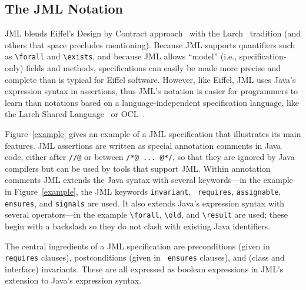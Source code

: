 \subsection{The JML Notation}
\label{notation}

JML blends Eiffel's Design by Contract approach~\cite{Meyer97} with
the Larch~\cite{Guttag-Horning93} tradition (and others that space
precludes mentioning).  Because JML supports quantifiers such as
\verb_\forall_ and \verb_\exists_, and because JML allows ``model''
(i.e., specification-only) fields and methods, specifications can
easily be made more precise and complete than is typical for Eiffel software.
However, like Eiffel, JML uses Java's expression syntax in assertions,
thus JML's notation is easier for programmers to learn than notations
based on a language-independent specification language, like the Larch Shared
Language~\cite{Leavens-Baker-Ruby03,Leavens-etal03a} or
OCL~\cite{WarmerKleppe99}.


\begin{figure*}
{\small
}
\caption{\label{example}Example JML specification}
\end{figure*}

Figure~\ref{example} gives an example of a JML specification that
illustrates its main features.  JML assertions are written as special
annotation comments in Java code,
either after \verb_//@_ or between \verb_/*@ ... @*/_,
so that they are ignored by Java compilers but can be used
by tools that support JML\@.  Within annotation comments JML extends the
Java syntax with several keywords---in the example in
Figure~\ref{example}, the JML keywords {\tt invariant}, {\tt
  requires}, {\tt assignable}, {\tt ensures}, and {\tt signals} are
used.  It also extends Java's expression syntax with several
operators---in the example \verb_\forall_, \verb_\old_, and
\verb_\result_ are used; these begin with a backslash so they do not
clash with existing Java identifiers.

The central ingredients of a JML specification are preconditions
(given in {\tt requires} clauses), postconditions (given in {\tt
  ensures} clauses), and (class and interface) invariants.  These are
all expressed as boolean expressions in JML's extension to Java's
expression syntax.

